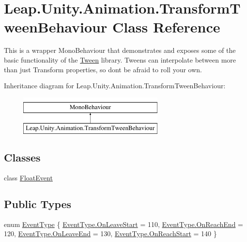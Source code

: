 \hypertarget{class_leap_1_1_unity_1_1_animation_1_1_transform_tween_behaviour}{}\section{Leap.\+Unity.\+Animation.\+Transform\+Tween\+Behaviour Class Reference}
\label{class_leap_1_1_unity_1_1_animation_1_1_transform_tween_behaviour}


This is a wrapper Mono\+Behaviour that demonstrates and exposes some of the basic functionality of the \mbox{\hyperlink{struct_leap_1_1_unity_1_1_animation_1_1_tween}{Tween}} library. Tweens can interpolate between more than just Transform properties, so don\textquotesingle{}t be afraid to roll your own.  


Inheritance diagram for Leap.\+Unity.\+Animation.\+Transform\+Tween\+Behaviour\+:\begin{figure}[H]
\begin{center}
\leavevmode
\includegraphics[height=2.000000cm]{class_leap_1_1_unity_1_1_animation_1_1_transform_tween_behaviour}
\end{center}
\end{figure}
\subsection*{Classes}
\begin{DoxyCompactItemize}
\item 
class \mbox{\hyperlink{class_leap_1_1_unity_1_1_animation_1_1_transform_tween_behaviour_1_1_float_event}{Float\+Event}}
\end{DoxyCompactItemize}
\subsection*{Public Types}
\begin{DoxyCompactItemize}
\item 
enum \mbox{\hyperlink{class_leap_1_1_unity_1_1_animation_1_1_transform_tween_behaviour_a67bb4276381fa709e2235bed246678c1}{Event\+Type}} \{ \mbox{\hyperlink{class_leap_1_1_unity_1_1_animation_1_1_transform_tween_behaviour_a67bb4276381fa709e2235bed246678c1a767205b643edabc0360536e14f912531}{Event\+Type.\+On\+Leave\+Start}} = 110, 
\mbox{\hyperlink{class_leap_1_1_unity_1_1_animation_1_1_transform_tween_behaviour_a67bb4276381fa709e2235bed246678c1adac8cae3a9226fe97abd27bc807585eb}{Event\+Type.\+On\+Reach\+End}} = 120, 
\mbox{\hyperlink{class_leap_1_1_unity_1_1_animation_1_1_transform_tween_behaviour_a67bb4276381fa709e2235bed246678c1a15f3fc0d3baf237a7963b5cfed5e7275}{Event\+Type.\+On\+Leave\+End}} = 130, 
\mbox{\hyperlink{class_leap_1_1_unity_1_1_animation_1_1_transform_tween_behaviour_a67bb4276381fa709e2235bed246678c1abb99168eba0f34d51c25935291d79510}{Event\+Type.\+On\+Reach\+Start}} = 140
 \}
\end{DoxyCompactItemize}

